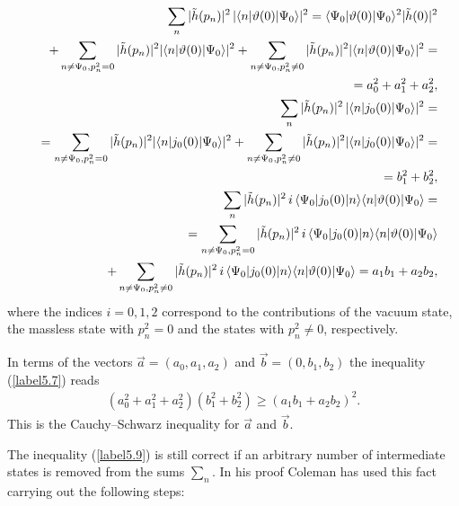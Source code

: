 \documentclass[a4paper,12pt] {article}
\begin{document}
\begin{eqnarray}\label{label5.8}
&&\sum_n |\tilde{h}(p_n)|^2 \,|\langle n|\vartheta(0)|\Psi_0\rangle|^2
= \langle \Psi_0|\vartheta(0)|\Psi_0\rangle^2|\tilde{h}(0)|^2
\nonumber\\&& + \sum_{n\neq \Psi_0, p^2_n = 0} |\tilde{h}(p_n)|^2
|\langle n|\vartheta(0)|\Psi_0\rangle|^2 + \sum_{n\neq \Psi_0, p^2_n
\neq 0} |\tilde{h}(p_n)|^2 |\langle n|\vartheta(0)|\Psi_0\rangle|^2
=\nonumber\\ &&= a^2_0 + a^2_1 + a^2_2,\nonumber\\
&&\sum_n |\tilde{h}(p_n)|^2 \,|\langle
n|j_0(0)|\Psi_0\rangle|^2 = \nonumber\\ &&= \sum_{ n\neq \Psi_0, p^2_n
= 0} |\tilde{h}(p_n)|^2 |\langle n|j_0(0)|\Psi_0\rangle|^2 +
\sum_{n\neq \Psi_0, p^2_n \neq 0} |\tilde{h}(p_n)|^2 |\langle
n|j_0(0)|\Psi_0\rangle|^2=\nonumber\\
&&\vspace{0.1in}=b^2_1 + b^2_2,\nonumber\\ &&\sum_n
|\tilde{h}(p_n)|^2 \,i\,\langle \Psi_0|j_0(0)|n\rangle\langle
n|\vartheta(0)|\Psi_0\rangle = \nonumber\\ 
&&=\sum_{n\neq \Psi_0, p^2_n = 0}
|\tilde{h}(p_n)|^2\,i\,\langle \Psi_0|j_0(0)|n\rangle \langle
n|\vartheta(0)|\Psi_0 \rangle\nonumber\\ && + \sum_{n\neq \Psi_0,
p^2_n \neq 0} |\tilde{h}(p_n)|^2\,i\,\langle \Psi_0|j_0(0)|n\rangle
\langle n|\vartheta(0)|\Psi_0 \rangle = a_1b_1 + a_2b_2,
\end{eqnarray}
%
where the indices $i=0,1,2$ correspond to the
contributions of the vacuum state, the massless state with $p^2_n = 0$
and the states with $p^2_n \neq 0$, respectively.

In terms of the vectors $\vec{a} =
(a_0, a_1, a_2)$ and $\vec{b} = (0, b_1, b_2)$ the inequality
(\ref{label5.7}) reads
%
\begin{eqnarray}\label{label5.9}
(a^2_0 + a^2_1 + a^2_2)(b^2_1 + b^2_2)\ge (a_1b_1 +
a_2b_2)^2.
\end{eqnarray}
%
This is the Cauchy--Schwarz inequality for $\vec{a}$ and $\vec{b}$.

The inequality (\ref{label5.9}) is still correct if an arbitrary
number of intermediate states is removed from the sums $\sum_n$. In
his proof Coleman has used this fact carrying out the following steps:
\end{document}
